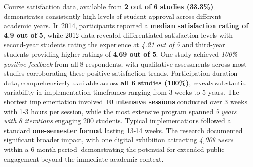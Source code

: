 \documentclass[
hf,
]{ceurart}
\begin{document}
Course satisfaction data, available from \textbf{2 out of 6 studies (33.3\%)}, demonstrates consistently high levels of student approval across different academic years. In 2014, participants reported a \textbf{median satisfaction rating of 4.9 out of 5}, while 2012 data revealed differentiated satisfaction levels with second-year students rating the experience at \textit{4.21 out of 5} and third-year students providing higher ratings of \textbf{4.69 out of 5}. One study achieved \textit{100\% positive feedback} from all 8 respondents, with qualitative assessments across most studies corroborating these positive satisfaction trends.
Participation duration data, comprehensively available across \textbf{all 6 studies (100\%)}, reveals substantial variability in implementation timeframes ranging from 3 weeks to 5 years. The shortest implementation involved \textbf{10 intensive sessions} conducted over 3 weeks with 1-3 hours per session, while the most extensive program spanned \textit{5 years with 8 iterations} engaging 200 students. Typical implementations followed a standard \textbf{one-semester format} lasting 13-14 weeks. The research documented significant broader impact, with one digital exhibition attracting \textit{4,000 users} within a 6-month period, demonstrating the potential for extended public engagement beyond the immediate academic context.



\end{document}
